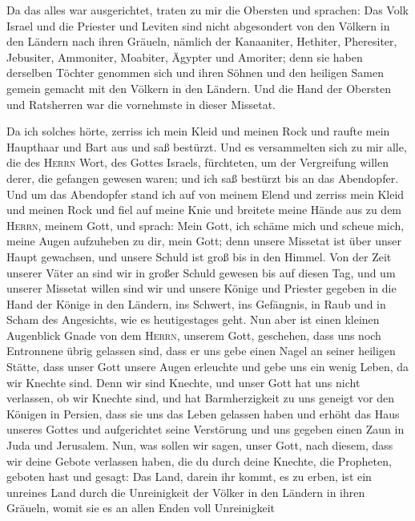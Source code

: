  Da das alles war ausgerichtet, traten zu mir die Obersten
und sprachen: Das Volk Israel und die Priester und Leviten sind nicht
abgesondert von den Völkern in den Ländern nach ihren Gräueln, nämlich
der Kanaaniter, Hethiter, Pheresiter, Jebusiter, Ammoniter, Moabiter,
Ägypter und Amoriter;  denn sie haben derselben Töchter
genommen sich und ihren Söhnen und den heiligen Samen gemein gemacht mit
den Völkern in den Ländern. Und die Hand der Obersten und Ratsherren war
die vornehmste in dieser Missetat.

 Da ich solches hörte, zerriss ich mein Kleid und meinen
Rock und raufte mein Haupthaar und Bart aus und saß bestürzt.
 Und es versammelten sich zu mir alle, die des
\textsc{Herrn} Wort, des Gottes Israels, fürchteten, um der Vergreifung
willen derer, die gefangen gewesen waren; und ich saß bestürzt bis an
das Abendopfer.  Und um das Abendopfer stand ich auf von
meinem Elend und zerriss mein Kleid und meinen Rock und fiel auf meine
Knie und breitete meine Hände aus zu dem \textsc{Herrn}, meinem Gott,
 und sprach: Mein Gott, ich schäme mich und scheue mich,
meine Augen aufzuheben zu dir, mein Gott; denn unsere Missetat ist über
unser Haupt gewachsen, und unsere Schuld ist groß bis in den Himmel.
 Von der Zeit unserer Väter an sind wir in großer Schuld
gewesen bis auf diesen Tag, und um unserer Missetat willen sind wir und
unsere Könige und Priester gegeben in die Hand der Könige in den
Ländern, ins Schwert, ins Gefängnis, in Raub und in Scham des
Angesichts, wie es heutigestages geht.  Nun aber ist einen
kleinen Augenblick Gnade von dem \textsc{Herrn}, unserem Gott,
geschehen, dass uns noch Entronnene übrig gelassen sind, dass er uns
gebe einen Nagel an seiner heiligen Stätte, dass unser Gott unsere Augen
erleuchte und gebe uns ein wenig Leben, da wir Knechte sind.
 Denn wir sind Knechte, und unser Gott hat uns nicht
verlassen, ob wir Knechte sind, und hat Barmherzigkeit zu uns geneigt
vor den Königen in Persien, dass sie uns das Leben gelassen haben und
erhöht das Haus unseres Gottes und aufgerichtet seine Verstörung und uns
gegeben einen Zaun in Juda und Jerusalem.  Nun, was
sollen wir sagen, unser Gott, nach diesem, dass wir deine Gebote
verlassen haben,  die du durch deine Knechte, die
Propheten, geboten hast und gesagt: Das Land, darein ihr kommt, es zu
erben, ist ein unreines Land durch die Unreinigkeit der Völker in den
Ländern in ihren Gräueln, womit sie es an allen Enden voll Unreinigkeit

